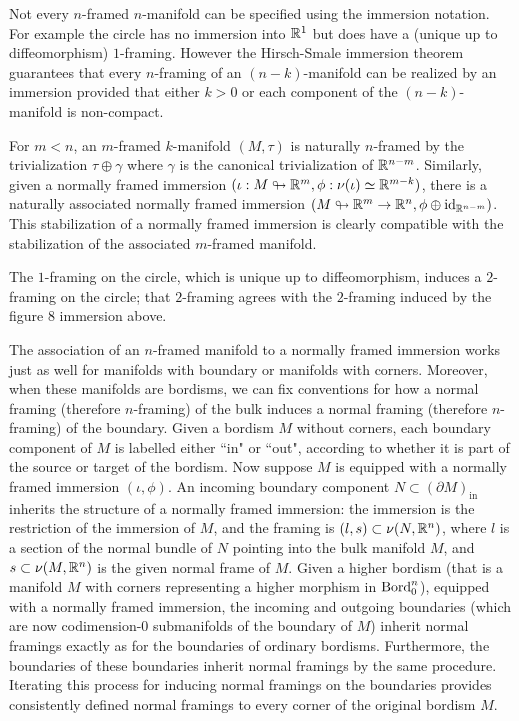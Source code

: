 \documentclass{amsart}
\begin{document}
\begin{remark}
Not every $n$-framed $n$-manifold can be specified using the immersion notation. For example the circle has no immersion into $\mathbb R^1$ but does have a (unique up to diffeomorphism) $1$-framing. However the Hirsch-Smale immersion theorem \cite{MR0119214, MR0105117} guarantees that every $n$-framing of an $(n-k)$-manifold can be realized by an immersion provided that either $k > 0$ or each component of the $(n-k)$-manifold is non-compact. 
\end{remark}

For $m < n$, an $m$-framed $k$-manifold $(M,\tau)$ is naturally $n$-framed by the trivialization $\tau \oplus \gamma$ where $\gamma$ is the canonical trivialization of $\mathbb R^{n-m}$.  Similarly, given a normally framed immersion $(\iota: M \looparrowright \mathbb R^m, \phi: \nu(\iota) \simeq \mathbb R^{m-k})$, there is a naturally associated normally framed immersion $(M \looparrowright \mathbb R^m \rightarrow \mathbb R^n, \phi \oplus \mathrm{id}_{\mathbb R^{n-m}})$.  This stabilization of a normally framed immersion is clearly compatible with the stabilization of the associated $m$-framed manifold.

\begin{example}
The $1$-framing on the circle, which is unique up to diffeomorphism, induces a $2$-framing on the circle; that $2$-framing agrees with the $2$-framing induced by the figure 8 immersion above. 
\end{example}

The association of an $n$-framed manifold to a normally framed immersion works just as well for manifolds with boundary or manifolds with corners.  Moreover, when these manifolds are bordisms, we can fix conventions for how a normal framing (therefore $n$-framing) of the bulk induces a normal framing (therefore $n$-framing) of the boundary.  Given a bordism $M$ without corners, each boundary component of $M$ is labelled either ``in" or ``out", according to whether it is part of the source or target of the bordism.  Now suppose $M$ is equipped with a normally framed immersion $(\iota,\phi)$.  An incoming boundary component $N \subset (\partial M)_{\textrm{in}}$ inherits the structure of a normally framed immersion: the immersion is the restriction of the immersion of $M$, and the framing is $(l, s) \subset \nu(N,\mathbb R^n)$, where $l$ is a section of the normal bundle of $N$ pointing into the bulk manifold $M$, and $s \subset \nu(M,\mathbb R^n)$ is the given normal frame of $M$.  Given a higher bordism (that is a manifold $M$ with corners representing a higher morphism in $\mathrm{Bord}_0^n$), equipped with a normally framed immersion, the incoming and outgoing boundaries (which are now codimension-0 submanifolds of the boundary of $M$) inherit normal framings exactly as for the boundaries of ordinary bordisms.  Furthermore, the boundaries of these boundaries inherit normal framings by the same procedure.  Iterating this process for inducing normal framings on the boundaries provides consistently defined normal framings to every corner of the original bordism $M$.
\end{document}
